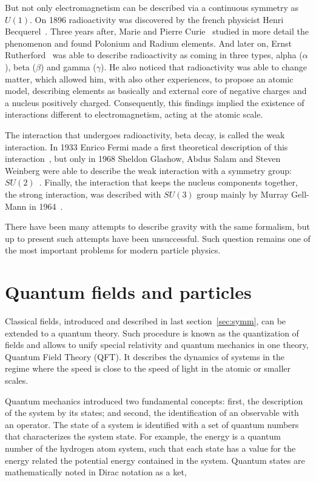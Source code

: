 But not only electromagnetism can be described via a continuous symmetry as $U(1)$. On 1896 radioactivity was discovered by the french physicist Henri Becquerel~\cite{Griffiths:2008zz}. Three years after, Marie and Pierre Curie~\cite{Griffiths:2008zz} studied in more detail the phenomenon and found Polonium and Radium elements. And later on, Ernst Rutherford~\cite{Griffiths:2008zz} was able to describe radioactivity as coming in three types, alpha ($\alpha$), beta ($\beta$) and gamma ($\gamma$). He also noticed that radioactivity was able to change matter, which allowed him, with also other experiences, to propose an atomic model, describing elements as basically and external core of negative charges and a nucleus positively charged. Consequently, this findings implied the existence of interactions different to electromagnetism, acting at the atomic scale.

The interaction that undergoes radioactivity, beta decay, is called the weak interaction. In 1933 Enrico Fermi made a first theoretical description of this interaction~\cite{Griffiths:2008zz}, but only in 1968 Sheldon Glashow, Abdus Salam and Steven Weinberg were able to describe the weak interaction with a symmetry group: $SU(2)$~\cite{Griffiths:2008zz}. Finally, the interaction that keeps the nucleus components together, the strong interaction, was described with $SU(3)$ group mainly by Murray Gell-Mann in 1964~\cite{Griffiths:2008zz}.

There have been many attempts to describe gravity with the same formalism, but up to present such attempts have been unsuccessful. Such question remains one of the most important problems for modern particle physics.  

\section{Quantum fields and particles}
\label{sec:fields}

Classical fields, introduced and described in last section~\ref{sec:symm}, can be extended to a quantum theory. Such procedure is known as the quantization of fields and allows to unify special relativity and quantum mechanics in one theory, Quantum Field Theory (QFT). It describes the dynamics of systems in the regime where the speed is close to the speed of light in the atomic or smaller scales.

Quantum mechanics introduced two fundamental concepts: first, the description of the system by its states; and second, the identification of an observable with an operator. The state of a system is identified with a set of quantum numbers that characterizes the system state. For example, the energy is a quantum number of the hydrogen atom system, such that each state has a value for the energy related the potential energy contained in the system. Quantum states are mathematically noted in Dirac notation as a ket,

